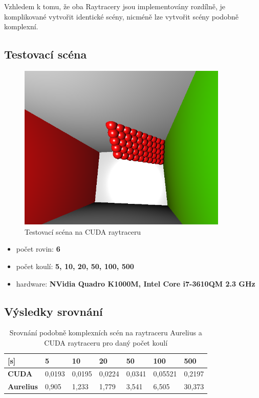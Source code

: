 \documentclass[12pt,a4paper,titlepage,final]{report}
\begin{document}
Vzhledem k tomu, že oba Raytracery jsou implementovány rozdílně, je komplikované vytvořit identické scény, nicméně lze vytvořit scény podobně komplexní.

\subsection{Testovací scéna}

\begin{figure}[ht]
\begin{center}
\includegraphics[width=10cm]{images/test-scene.png}
\caption{Testovací scéna na CUDA raytraceru}
\label{fig:theory}
\end{center}
\end{figure}

\begin{itemize}
	\item počet rovin: \textbf{6}
	\item počet koulí: \textbf{5, 10, 20, 50, 100, 500}
	\item hardware: \textbf{NVidia Quadro K1000M, Intel Core i7-3610QM 2.3 GHz}
\end{itemize}

\subsection{Výsledky srovnání}

\begin{table}
\centering
\begin{tabular}{ | l | l | l | l | l | l | l |}
\hline
\textbf{[s]} & 5 & 10 & 20 & 50 & 100 & 500 \\
\hline
\textbf{CUDA} & 0,0193 & 0,0195 & 0,0224 & 0,0341 & 0,05521 & 0,2197 \\
\hline
\textbf{Aurelius} & 0,905 & 1,233 & 1,779 & 3,541 & 6,505 & 30,373 \\
\hline
\end{tabular}
\caption{Srovnání podobně komplexních scén na raytraceru Aurelius a CUDA raytraceru pro daný počet koulí}
\end{table}
\end{document}
